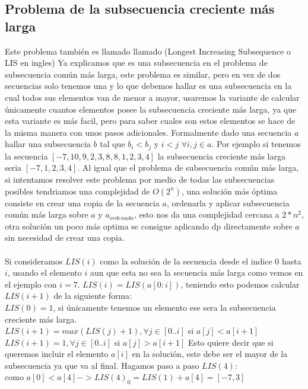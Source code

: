 \subsection{Problema de la subsecuencia creciente más larga}
Este problema también es llamado llamado (Longest Increasing Subsequence o LIS en ingles)
Ya explicamos que es una subsecuencia en el problema de subsecuencia común más larga, este problema es similar, pero en vez de dos secuencias solo tenemos una y lo que debemos hallar es una subsecuencia en la cual todos sus elementos van de menor a mayor, usaremos la variante de calcular únicamente cuantos elementos posee la subsecuencia creciente más larga, ya que esta variante es más facil, pero para saber cuales son estos elementos se hace de la misma manera con unos pasos adicionales. Formalmente dado una secuencia $a$ hallar una subsecuencia $b$ tal que $b_i<b_j$ y $i<j$ $\forall i,j \in a$. Por ejemplo si tenemos la secuencia $[-7, 10, 9, 2, 3, 8, 8, 1, 2, 3, 4]$ la subsecuencia creciente más larga seria $[-7,1,2,3,4]$.
Al igual que el problema de subsecuencia común más larga, si intentamos resolver este problema por medio de todas las subsecuencias posibles tendriamos una complejidad de $O(2^n)$, una solución más óptima consiste en crear una copia de la secuencia $a$, ordenarla y aplicar subsecuencia común más larga sobre $a$ y $a_{ordenada}$, esto nos da una complejidad cercana a $2*n^2$, otra solución un poco más optima se consigue aplicando dp directamente sobre $a$ sin necesidad de crear una copia.
\\
\\Si consideramos $LIS(i)$ como la solución de la secuencia desde el indice $0$ hasta $i$, usando el elemento $i$ aun que esta no sea la secuencia más larga como vemos en el ejemplo con $i=7$. $LIS(i)=LIS(a[0:i])$, teniendo esto podemos calcular $LIS(i+1)$ de la siguiente forma:
\\$LIS(0) = 1$, si únicamente tenemos un elemento ese sera la subsecuencia creciente más larga.
\\$LIS(i+1) = max(LIS(j)+1), \forall j \in [0..i]$ si $a[j]<a[i+1]$
\\$LIS(i+1) = 1, \forall j \in [0..i]$ si $a[j]>a[i+1]$
Esto quiere decir que si queremos incluir el elemento $a[i]$ en la solución, este debe ser el mayor de la subsecuencia ya que va al final. Hagamos paso a paso $LIS(4)$:
\\como $a[0] < a[4] -> LIS(4)_0 = LIS(1) + a[4] = [-7,3]$
